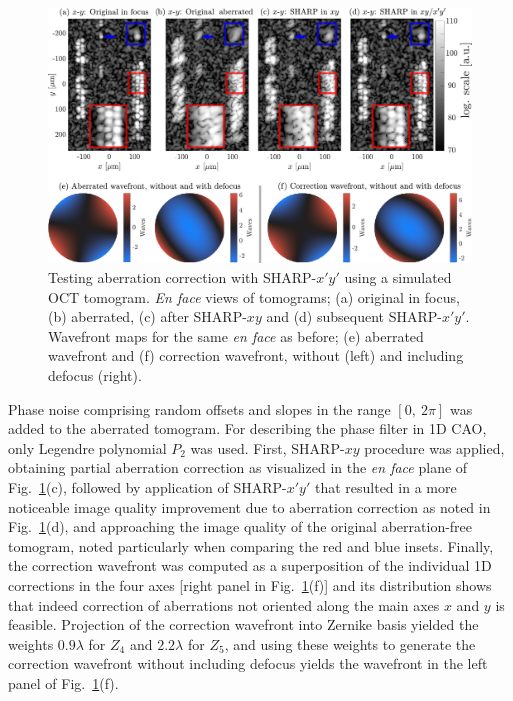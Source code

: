 \begin{figure}[htb!]
	\centering
	\includegraphics[width=\textwidth]{Figures/SHARP/SHARP45d_Int.pdf}
	\caption[Testing aberration correction with SHARP-$x'y'$ using a simulated OCT tomogram.]{Testing aberration correction with SHARP-$x'y'$ using a simulated OCT tomogram. \textit{En face} views of tomograms; (a) original in focus, (b) aberrated, (c) after SHARP-$xy$ and (d) subsequent SHARP-$x'y'$. Wavefront maps for the same \textit{en face} as before; (e) aberrated wavefront and (f) correction wavefront, without (left) and including defocus (right).}
	\label{fig:SHARP45d_Int}
\end{figure}

Phase noise comprising random offsets and slopes in the range $[0,\ 2\pi]$ was added to the aberrated tomogram. For describing the phase filter in 1D CAO, only Legendre polynomial $P_2$ was used. First, SHARP-$xy$ procedure was applied, obtaining partial aberration correction as visualized in the \textit{en face} plane of Fig.~\ref{fig:SHARP45d_Int}(c), followed by application of SHARP-$x'y'$ that resulted in a more noticeable image quality improvement due to aberration correction as noted in Fig.~\ref{fig:SHARP45d_Int}(d), and approaching the image quality of the original aberration-free tomogram, noted particularly when comparing the red and blue insets. Finally, the correction wavefront was computed as a superposition of the individual 1D corrections in the four axes [right panel in Fig.~\ref{fig:SHARP45d_Int}(f)] and its distribution shows that indeed correction of aberrations not oriented along the main axes $x$ and $y$ is feasible. Projection of the correction wavefront into Zernike basis yielded the weights $0.9\lambda$ for $Z_4$ and $2.2\lambda$ for $Z_5$, and using these weights to generate the correction wavefront without including defocus yields the wavefront in the left panel of Fig.~\ref{fig:SHARP45d_Int}(f).

